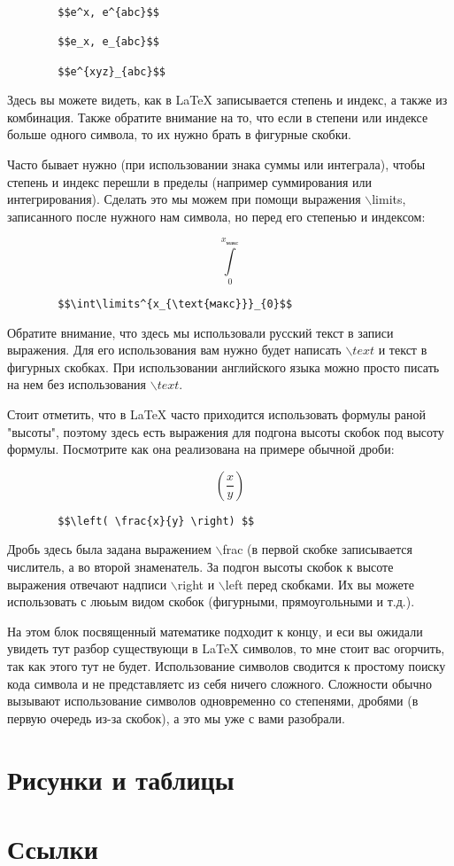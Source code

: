     \begin{verbatim}
        $$e^x, e^{abc}$$
        
        $$e_x, e_{abc}$$
        
        $$e^{xyz}_{abc}$$
    \end{verbatim} 
    
    Здесь вы можете видеть, как в \LaTeX{} записывается степень и индекс, а также из комбинация. Также обратите внимание на то, что если в степени или индексе больше одного символа, то их нужно брать в фигурные скобки.
    
    Часто бывает нужно (при использовании знака суммы или интеграла), чтобы степень и индекс перешли в пределы (например суммирования или интегрирования). Сделать это мы можем при помощи выражения $\backslash$limits, записанного после нужного нам символа, но перед его степенью и индексом:
    
    $$\int\limits^{x_{\text{макс}}}_{0}$$
    
    \begin{verbatim}
        $$\int\limits^{x_{\text{макс}}}_{0}$$
    \end{verbatim}
    
    Обратите внимание, что здесь мы использовали русский текст в записи выражения. Для его использования вам нужно будет написать $\backslash text{}$ и текст в фигурных скобках. При использовании английского языка можно просто писать на нем без использования $\backslash text{}$.
    
    Стоит отметить, что в \LaTeX{} часто приходится использовать формулы раной "высоты", поэтому здесь есть выражения для подгона высоты скобок под высоту формулы. Посмотрите как она реализована на примере обычной дроби:
    
    $$\left( \frac{x}{y} \right) $$
    
    \begin{verbatim}
        $$\left( \frac{x}{y} \right) $$
    \end{verbatim}
    
    Дробь здесь была задана выражением $\backslash$frac{}{} (в первой скобке записывается числитель, а во второй знаменатель. За подгон высоты скобок к высоте выражения отвечают надписи $\backslash$right и $\backslash$left перед скобками. Их вы можете использовать с люьым видом скобок (фигурными, прямоугольными и т.д.).
    
    
    
    На этом блок посвященный математике подходит к концу, и еси вы ожидали увидеть тут разбор существующи в \LaTeX{} символов, то мне стоит вас огорчить, так как этого тут не будет. Использование символов сводится к простому поиску кода символа и не представляетс из себя ничего сложного. Сложности обычно вызывают использование символов одновременно со степенями, дробями (в первую очередь из-за скобок), а это мы уже с вами разобрали.
    
    \section{Рисунки и таблицы}
    \section{Ссылки}
